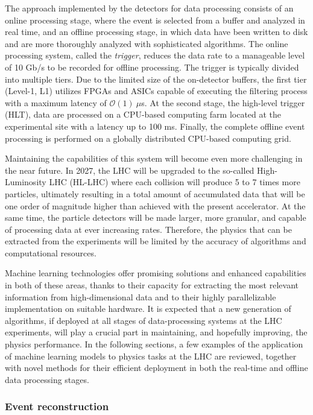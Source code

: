The approach implemented by the detectors for data processing consists of an online processing stage, where the event is selected from a buffer and analyzed in real time, and an offline processing stage, in which data have been written to disk and are more thoroughly analyzed with sophisticated algorithms. 
The online processing system, called the \emph{trigger}, reduces the data rate to a manageable level of 10 Gb/s to be recorded for offline processing. 
The trigger is typically divided into multiple tiers. 
Due to the limited size of the on-detector buffers, the first tier (Level-1, L1) utilizes FPGAs and ASICs capable of executing the filtering process with a maximum latency of $\mathcal{O}(1)~\mu$s. 
At the second stage, the high-level trigger (HLT), data are processed on a CPU-based computing farm located at the experimental site with a latency up to 100 ms. 
Finally, the complete offline event processing is performed on a globally distributed CPU-based computing grid.

Maintaining the capabilities of this system will become even more challenging in the near future.
In 2027, the LHC will be upgraded to the so-called High-Luminosity LHC (HL-LHC) where each collision will produce 5 to 7 times more particles, ultimately resulting in a total amount of accumulated data that will be one order of magnitude higher than achieved with the present accelerator. 
At the same time, the particle detectors will be made larger, more granular, and capable of processing data at ever increasing rates. Therefore, the physics that can be extracted from the experiments will be limited by the accuracy of algorithms and computational resources. 

Machine learning technologies offer promising solutions and enhanced capabilities in both of these areas, thanks to their capacity for extracting the most relevant information from high-dimensional data and to their highly parallelizable implementation on suitable hardware.
It is expected that a new generation of algorithms, if deployed at all stages of data-processing systems at the LHC experiments, will play a crucial part in maintaining, and hopefully improving, the physics performance. In the following sections, a few examples of the application of machine learning models to physics tasks at the LHC are reviewed, together with novel methods for their efficient deployment in both the real-time and offline data processing stages.

\subsubsection{Event reconstruction}
\label{sec:lhceventreco}

